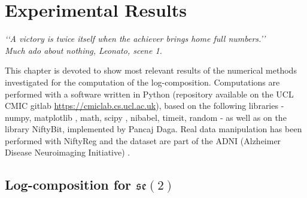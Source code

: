 \chapter{Experimental Results}\label{ch:results}

\begin{flushright}
	\emph{\lq\lq A victory is twice itself when the achiever brings home full numbers.\rq\rq \\
		       \emph{Much ado about nothing}, Leonato, scene 1.}
\end{flushright}

\vspace{0.6cm}


This chapter is devoted to show most relevant results of the numerical methods investigated for the computation of the log-composition.
\newline
Computations are performed with a software written in Python 
(repository available on the UCL CMIC gitlab \href{https://cmiclab.cs.ucl.ac.uk}{https://cmiclab.cs.ucl.ac.uk}), based on 
the following libraries - numpy, matplotlib \cite{hunter2007}, math, scipy \cite{scipy}, nibabel, timeit, random - as well as on the library NiftyBit, implemented by Pancaj Daga. Real data manipulation has been performed with NiftyReg \cite{modat2010fast} and the dataset are part of the ADNI (Alzheimer Disease Neuroimaging Initiative) \cite{jack2008alzheimer}.

\section{Log-composition for $\mathfrak{se}(2)$}

